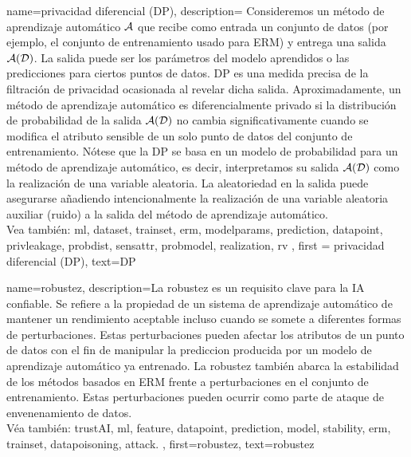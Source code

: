		

	 {name=privacidad diferencial (DP),
	  description={
		  Consideremos un método de aprendizaje automático $\mathcal{A}$ que recibe como entrada un conjunto de datos (por ejemplo, el conjunto de entrenamiento
		  usado para ERM) y entrega una salida $\mathcal{A}(\mathcal{D})$. La salida 
		  puede ser los parámetros del modelo aprendidos o las predicciones para ciertos puntos de datos. 
		  DP es una medida precisa de la filtración de privacidad ocasionada al revelar dicha salida.
		 Aproximadamente, un método de aprendizaje automático es diferencialmente privado si la distribución de probabilidad
		  de la salida $\mathcal{A}(\mathcal{D})$ no cambia significativamente cuando se modifica el atributo sensible
		  de un solo punto de datos del conjunto de entrenamiento. Nótese que la DP 
		  se basa en un modelo de probabilidad para un método de aprendizaje automático, es decir, interpretamos su salida $\mathcal{A}(\mathcal{D})$ 
		  como la realización de una variable aleatoria. La aleatoriedad en la salida puede asegurarse añadiendo intencionalmente la
		  realización de una variable aleatoria auxiliar (ruido) a la salida del método de aprendizaje automático.
		  \\
		  Vea también: \gls{ml}, \gls{dataset}, \gls{trainset}, \gls{erm}, \gls{modelparams}, \gls{prediction}, \gls{datapoint}, \gls{privleakage}, \gls{probdist}, \gls{sensattr}, \gls{probmodel}, \gls{realization}, \gls{rv}  }, 
		 first = {privacidad diferencial (DP)}, text={DP} 
	 }

	 {name={robustez},
		 description={La robustez es un requisito clave para la IA confiable. 
		 Se refiere a la propiedad de un sistema de aprendizaje automático de mantener un rendimiento aceptable incluso 
		 cuando se somete a diferentes formas de perturbaciones. Estas perturbaciones pueden afectar los
		 atributos de un punto de datos con el fin de manipular la prediccion producida 
		 por un modelo de aprendizaje automático ya entrenado. La robustez también abarca la estabilidad
		 de los métodos basados en ERM frente a perturbaciones en el conjunto de entrenamiento. 
		 Estas perturbaciones pueden ocurrir como parte de ataque de envenenamiento de datos.\\ 
		 Véa también: \gls{trustAI}, \gls{ml}, \gls{feature}, \gls{datapoint}, \gls{prediction}, 
		 \gls{model}, \gls{stability}, \gls{erm}, \gls{trainset}, \gls{datapoisoning}, \gls{attack}.
		 }, 
		 first={robustez}, 
		 text={robustez} 
	 }
	 

